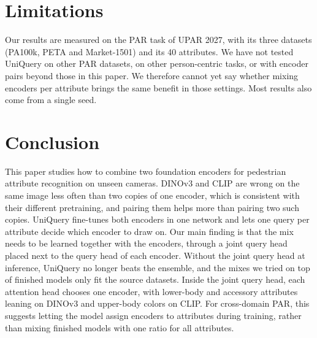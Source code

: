 \documentclass[10pt,twocolumn,letterpaper]{article}
\begin{document}
\section{Limitations}
\label{sec:limits}

Our results are measured on the PAR task of UPAR 2027, with its three datasets (PA100k, PETA and Market-1501) and its 40 attributes. We have not tested UniQuery on other PAR datasets, on other person-centric tasks, or with encoder pairs beyond those in this paper. We therefore cannot yet say whether mixing encoders per attribute brings the same benefit in those settings. Most results also come from a single seed.

\section{Conclusion}
\label{sec:conclusion}

This paper studies how to combine two foundation encoders for pedestrian attribute recognition on unseen cameras. DINOv3 and CLIP are wrong on the same image less often than two copies of one encoder, which is consistent with their different pretraining, and pairing them helps more than pairing two such copies. UniQuery fine-tunes both encoders in one network and lets one query per attribute decide which encoder to draw on. Our main finding is that the mix needs to be learned together with the encoders, through a joint query head placed next to the query head of each encoder. Without the joint query head at inference, UniQuery no longer beats the ensemble, and the mixes we tried on top of finished models only fit the source datasets. Inside the joint query head, each attention head chooses one encoder, with lower-body and accessory attributes leaning on DINOv3 and upper-body colors on CLIP. For cross-domain PAR, this suggests letting the model assign encoders to attributes during training, rather than mixing finished models with one ratio for all attributes.

{\small


}
\end{document}
